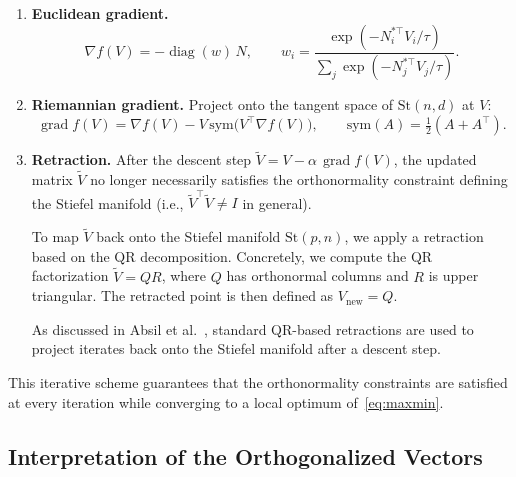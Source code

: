 \documentclass[
  journal=medium,
  manuscript=article-type,
  year=2025,
  volume=1,
]{cup-journal}
\newcommand{\St}{\mathrm{St}}
\newcommand{\sym}{\mathrm{sym}}
\newcommand{\TODO}[1]{\textcolor{red}{\textbf{[TODO: #1]}}}
\begin{document}
\begin{enumerate}
    \item \textbf{Euclidean gradient.}
    \begin{equation}
        \nabla f(V) = -\operatorname{diag}(w)\, N,
        \qquad
        w_i = \frac{\exp(-N_i^{*\top} V_i / \tau)}{\sum_j \exp(-N_j^{*\top} V_j / \tau)}.
    \end{equation}

    \item \textbf{Riemannian gradient.}
    Project onto the tangent space of $\St(n,d)$ at $V$:
    \begin{equation}
        \operatorname{grad} f(V)
        = \nabla f(V) - V\,\sym\!\bigl(V^\top \nabla f(V)\bigr),
        \qquad
        \sym(A) = \tfrac{1}{2}(A + A^\top).
    \end{equation}

    \item \textbf{Retraction.}
After the descent step $\tilde{V} = V - \alpha\,\operatorname{grad} f(V)$, the updated matrix $\tilde{V}$ no longer necessarily satisfies the orthonormality constraint defining the Stiefel manifold (i.e., $\tilde{V}^\top \tilde{V} \neq I$ in general). 

To map $\tilde{V}$ back onto the Stiefel manifold $\mathrm{St}(p,n)$, we apply a retraction based on the QR decomposition. Concretely, we compute the QR factorization
$\tilde{V} = QR$,
where $Q$ has orthonormal columns and $R$ is upper triangular. The retracted point is then defined as
$V_{\mathrm{new}} = Q$.

As discussed in Absil et al.~\cite[Chapter 4]{absil2009optimization}, standard QR-based retractions are used to project iterates back onto the Stiefel manifold after a descent step.
\end{enumerate}

This iterative scheme guarantees that the orthonormality constraints are
satisfied at every iteration while converging to a local optimum of~\eqref{eq:maxmin}.

\subsection{Interpretation of the Orthogonalized Vectors}
\label{sec:ortho:interpretation}


\end{document}
